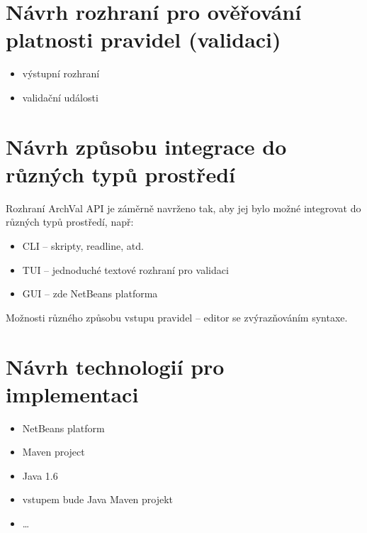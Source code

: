 \section{Návrh rozhraní pro ověřování platnosti pravidel (validaci)}
\begin{itemize}
\item výstupní rozhraní
\item validační události
\end{itemize}

\section{Návrh způsobu integrace do různých typů prostředí}

Rozhraní ArchVal API je záměrně navrženo tak, aby jej bylo možné integrovat do různých typů prostředí, např:

\begin{itemize}
\item CLI -- skripty, readline, atd.
\item TUI -- jednoduché textové rozhraní pro validaci
\item GUI -- zde NetBeans platforma
\end{itemize}

Možnosti různého způsobu vstupu pravidel -- editor se zvýrazňováním syntaxe.

\section{Návrh technologií pro implementaci}
\begin{itemize}
\item NetBeans platform
\item Maven project
\item Java 1.6
\item vstupem bude Java Maven projekt
\item \ldots
\end{itemize}
